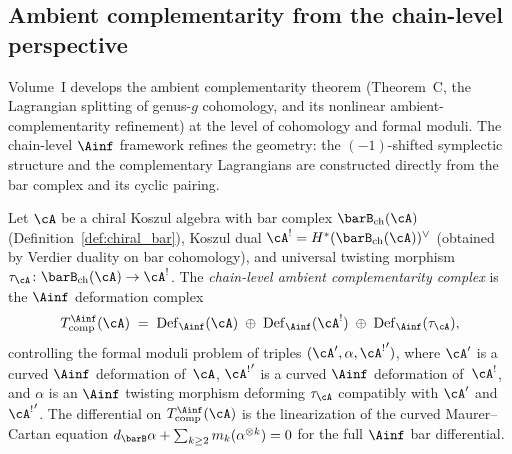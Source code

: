 
\providecommand{\fn}{\mathfrak{n}}
\providecommand{\fb}{\mathfrak{b}}
\providecommand{\fh}{\mathfrak{h}}
\providecommand{\fsl}{\mathfrak{sl}}
\providecommand{\Bl}{\operatorname{Bl}}
\providecommand{\cN}{\mathcal{N}}
\providecommand{\SL}{\mathrm{SL}}
\providecommand{\fso}{\mathfrak{so}}
\providecommand{\fsp}{\mathfrak{sp}}

\subsection{Ambient complementarity from the chain-level perspective}
\label{sec:ambient-complementarity-chain-level}

Volume~I develops the ambient complementarity theorem
(Theorem~C, the Lagrangian splitting of genus-$g$ cohomology, and its nonlinear ambient-complementarity refinement)
at the level of cohomology and formal moduli.
The chain-level $\Ainf$ framework refines the geometry: the
$(-1)$-shifted symplectic structure and the complementary
Lagrangians are constructed directly from the bar complex and its
cyclic pairing.

\begin{definition}
\label{def:chain-level-ambient-complex}
Let $\cA$ be a chiral Koszul algebra with bar complex
$\barB_{\mathrm{ch}}(\cA)$
(Definition~\ref{def:chiral_bar}), Koszul dual
$\cA^! = H^*(\barB_{\mathrm{ch}}(\cA))^\vee$
(obtained by Verdier duality on bar cohomology), and
universal twisting morphism
$\tau_\cA \colon \barB_{\mathrm{ch}}(\cA) \to \cA^!$.
The \emph{chain-level ambient complementarity complex} is the
$\Ainf$ deformation complex
\[
T_{\mathrm{comp}}^{\Ainf}(\cA)
\;=\;
\mathrm{Def}_{\Ainf}(\cA)
\;\oplus\;
\mathrm{Def}_{\Ainf}(\cA^!)
\;\oplus\;
\mathrm{Def}_{\Ainf}(\tau_\cA),
\]
controlling the formal moduli problem of triples
$({\cA}', \alpha, {\cA^!}')$, where ${\cA}'$ is a curved
$\Ainf$ deformation of~$\cA$, ${\cA^!}'$ is a curved
$\Ainf$ deformation of~$\cA^!$, and $\alpha$ is an $\Ainf$
twisting morphism deforming $\tau_\cA$ compatibly with
${\cA}'$ and~${\cA^!}'$. The differential on
$T_{\mathrm{comp}}^{\Ainf}(\cA)$ is the linearization of
the curved Maurer--Cartan equation
$d_{\barB}\alpha
+ \sum_{k \ge 2} m_k(\alpha^{\otimes k}) = 0$
for the full $\Ainf$ bar differential.
\end{definition}

